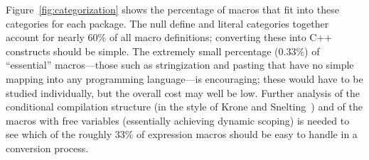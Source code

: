 \documentclass[11pt]{article}
\begin{document}
\begin{description}
% 
% 
% 
% 
% 
% 
% 
% 

\end{description}

Figure~\ref{fig:categorization} shows the percentage of macros that
fit into these categories for each package.  The null define and
literal categories together account for nearly 60\% of all
macro definitions; converting these into C++ constructs
should be simple.  The extremely small percentage (0.33\%) of
``essential'' macros---those such as stringization and pasting that
have no simple mapping into any programming language---is encouraging;
these would have to be studied individually, but the overall cost
may well be low.  Further analysis of the conditional compilation
structure (in the style of Krone and Snelting~\cite{Krone94}) and of
the macros with free variables (essentially achieving dynamic scoping)
is needed to see which of the roughly 33\% of expression macros should
be easy to handle in a conversion process.
\end{document}
